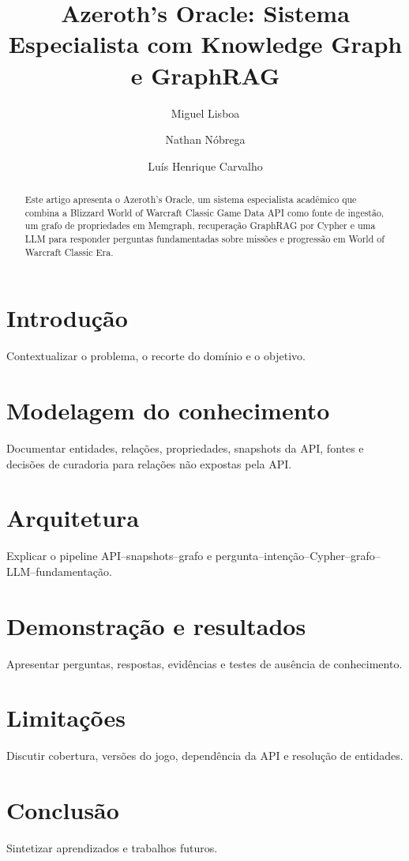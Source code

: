 \documentclass[12pt]{article}
\title{Azeroth's Oracle: Sistema Especialista com Knowledge Graph e GraphRAG}
\author{Miguel Lisboa \and Nathan Nóbrega \and Luís Henrique Carvalho}
\begin{document}
\maketitle
\begin{abstract}
Este artigo apresenta o Azeroth's Oracle, um sistema especialista acadêmico que combina a Blizzard World of Warcraft Classic Game Data API como fonte de ingestão, um grafo de propriedades em Memgraph, recuperação GraphRAG por Cypher e uma LLM para responder perguntas fundamentadas sobre missões e progressão em World of Warcraft Classic Era.
\end{abstract}
\section{Introdução}
Contextualizar o problema, o recorte do domínio e o objetivo.
\section{Modelagem do conhecimento}
Documentar entidades, relações, propriedades, snapshots da API, fontes e decisões de curadoria para relações não expostas pela API.
\section{Arquitetura}
Explicar o pipeline API--snapshots--grafo e pergunta--intenção--Cypher--grafo--LLM--fundamentação.
\section{Demonstração e resultados}
Apresentar perguntas, respostas, evidências e testes de ausência de conhecimento.
\section{Limitações}
Discutir cobertura, versões do jogo, dependência da API e resolução de entidades.
\section{Conclusão}
Sintetizar aprendizados e trabalhos futuros.
\end{document}
